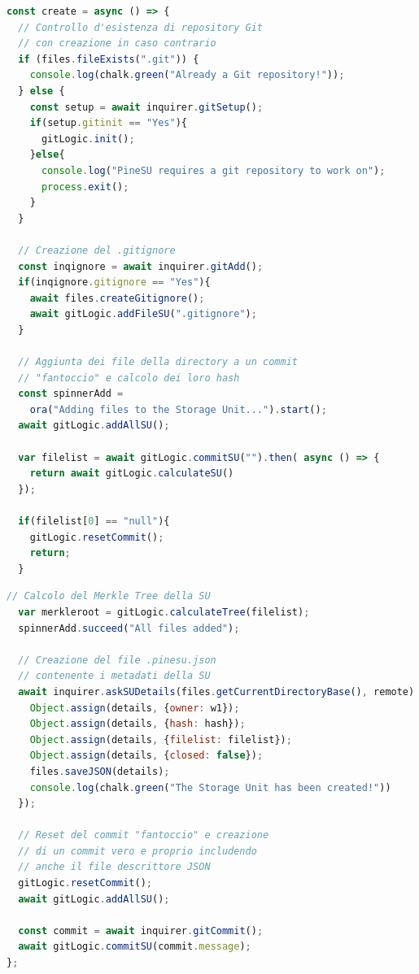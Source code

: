 \begin{lstlisting}[language=JavaScript]
const create = async () => {
  // Controllo d'esistenza di repository Git
  // con creazione in caso contrario
  if (files.fileExists(".git")) {
    console.log(chalk.green("Already a Git repository!"));
  } else {
    const setup = await inquirer.gitSetup();
    if(setup.gitinit == "Yes"){
      gitLogic.init();
    }else{
      console.log("PineSU requires a git repository to work on");
      process.exit();
    }
  }

  // Creazione del .gitignore 
  const inqignore = await inquirer.gitAdd();
  if(inqignore.gitignore == "Yes"){
    await files.createGitignore();
    await gitLogic.addFileSU(".gitignore");
  }

  // Aggiunta dei file della directory a un commit
  // "fantoccio" e calcolo dei loro hash
  const spinnerAdd = 
    ora("Adding files to the Storage Unit...").start();
  await gitLogic.addAllSU();

  var filelist = await gitLogic.commitSU("").then( async () => {
    return await gitLogic.calculateSU()
  });
  
  if(filelist[0] == "null"){
    gitLogic.resetCommit();
    return;
  }
\end{lstlisting}
\newpage
\begin{lstlisting}[language=JavaScript, firstnumber=36]
  // Calcolo del Merkle Tree della SU
  var merkleroot = gitLogic.calculateTree(filelist);
  spinnerAdd.succeed("All files added");

  // Creazione del file .pinesu.json
  // contenente i metadati della SU
  await inquirer.askSUDetails(files.getCurrentDirectoryBase(), remote).then((details) => {
    Object.assign(details, {owner: w1});
    Object.assign(details, {hash: hash});
    Object.assign(details, {filelist: filelist});
    Object.assign(details, {closed: false});
    files.saveJSON(details);
    console.log(chalk.green("The Storage Unit has been created!"))
  });
  
  // Reset del commit "fantoccio" e creazione
  // di un commit vero e proprio includendo
  // anche il file descrittore JSON
  gitLogic.resetCommit();
  await gitLogic.addAllSU();

  const commit = await inquirer.gitCommit();
  await gitLogic.commitSU(commit.message);
};
\end{lstlisting}

\newpage

